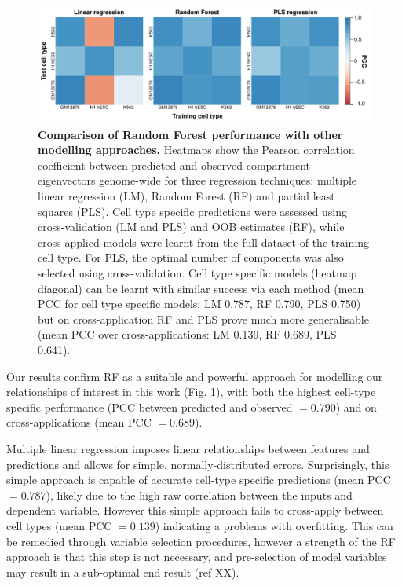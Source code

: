 \documentclass[a4paper,11pt,oneside]{book}
\begin{document}
\begin{figure}
\begin{center} 
\includegraphics[width=1.2\textwidth]{figs/diffmethods.pdf}
\captionsetup{width=1.2\textwidth} 
\caption{ {\bf Comparison of Random Forest performance with other modelling approaches. }
Heatmaps show the Pearson correlation coefficient between predicted and observed compartment eigenvectors genome-wide for three regression techniques: multiple linear regression (LM), Random Forest (RF) and partial least squares (PLS). Cell type specific predictions were assessed using cross-validation (LM and PLS) and OOB estimates (RF), while cross-applied models were learnt from the full dataset of the training cell type. For PLS, the optimal number of components was also selected using cross-validation. Cell type specific models (heatmap diagonal) can be learnt with similar success via each method (mean PCC for cell type specific models: LM 0.787, RF 0.790, PLS 0.750) but on cross-application RF and PLS prove much more generalisable (mean PCC over cross-applications: LM 0.139, RF 0.689, PLS 0.641).
}\label{fig:diffmethods}
\end{center} 
\end{figure} 

Our results confirm RF as a suitable and powerful approach for modelling our relationships of interest in this work (Fig. \ref{fig:diffmethods}), with both the highest cell-type specific performance (PCC between predicted and observed $=0.790$) and on cross-applications (mean PCC $= 0.689$). 

Multiple linear regression imposes linear relationships between features and predictions and allows for simple, normally-distributed errors. Surprisingly, this simple approach is capable of accurate cell-type specific predictions (mean PCC $= 0.787$), likely due to the high raw correlation between the inputs and dependent variable. However this simple approach fails to cross-apply between cell types (mean PCC $=0.139$) indicating a problems with overfitting. This can be remedied through variable selection procedures, however a strength of the RF approach is that this step is not necessary, and pre-selection of model variables may result in a sub-optimal end result (ref XX).
\end{document}
